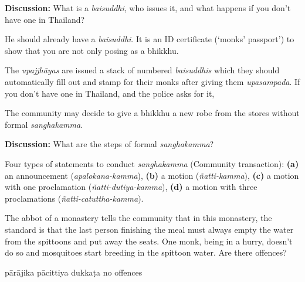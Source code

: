 \begin{exam}{\autoExamName}
\begin{problem*}
\begin{parts}
    \bigskip

    \textbf{Discussion:} What is a \emph{baisuddhi}, who issues it, and what happens if you don't have one in Thailand?

    \begin{solution}
      He should already have a \emph{baisuddhi}. It is an ID certificate
      (`monks' passport') to show that you are not only posing as a bhikkhu.

      The \emph{upajjhāyas} are issued a stack of numbered \emph{baisuddhis}
      which they should automatically fill out and stamp for their monks after
      giving them \emph{upasampada}. If you don't have one in Thailand, and the
      police asks for it,
    \end{solution}

  \item {} The community may decide to give a bhikkhu a new robe from the stores without formal \emph{sanghakamma}. 

    \bigskip

    \textbf{Discussion:} What are the steps of formal \emph{sanghakamma}?

  \begin{solution}
    Four types of statements to conduct \emph{sanghakamma} (Community transaction):
    \textbf{(a)} an announcement (\emph{apalokana-kamma}),
    \textbf{(b)} a motion (\emph{ñatti-kamma}),
    \textbf{(c)} a motion with one proclamation (\emph{ñatti-dutiya-kamma}),
    \textbf{(d)} a motion with three proclamations (\emph{ñatti-catuttha-kamma}).
  \end{solution}

  \end{parts}

\end{problem*}

\problemDivide

\begin{problem}

  The abbot of a monastery tells the community that in this monastery, the
  standard is that the last person finishing the meal must always empty the
  water from the spittoons and put away the seats. One monk, being in a hurry,
  doesn't do so and mosquitoes start breeding in the spittoon water. Are there
  offences?

  \bigskip

  \begin{answers}{4}
    \bChoices
     pārājika\eAns
     pācittiya\eAns
     dukkaṭa\eAns
     no offences\eAns
    \eChoices
  \end{answers}


\end{problem}
\end{exam}
